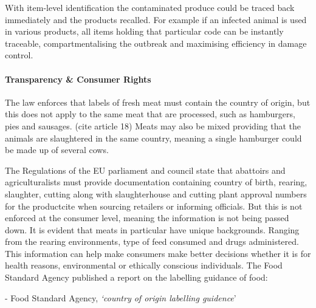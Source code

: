 \documentclass[a4paper, 11pt]{article}
\begin{document}
With item-level identification the contaminated produce could be traced back immediately and the products recalled.\cite{rfidFood} For example if an infected animal is used in various products, all items holding that particular code can be instantly traceable, compartmentalising the outbreak and maximising efficiency in damage control. 

\paragraph{Transparency \& Consumer Rights}
The law enforces that labels of fresh meat must contain the country of origin, but this does not apply to the same meat that are processed, such as hamburgers, pies and sausages. (cite article 18) Meats may also be mixed providing that the animals are slaughtered in the same country, meaning a single hamburger could be made up of several cows.\cite{FSA}

The Regulations of the EU parliament and council state that abattoirs and agriculturalists must provide documentation containing country of birth, rearing, slaughter, cutting along with slaughterhouse and cutting plant approval numbers for the productcite\cite{FSA} when sourcing retailers or informing officials. But this is not enforced at the consumer level, meaning the information is not being passed down. It is evident that meats in particular have unique backgrounds. Ranging from the rearing environments, type of feed consumed and drugs administered. This information can help make consumers make better decisions whether it is for health reasons, environmental or ethically conscious individuals. The Food Standard Agency published a report on the labelling guidance of food:
\vspace{\baselineskip}


\begin{quoting}
- Food Standard Agency, \emph{`country of origin labelling guidence}'\cite{FSA}
\end{quoting}
\vspace{\baselineskip}
\end{document}
